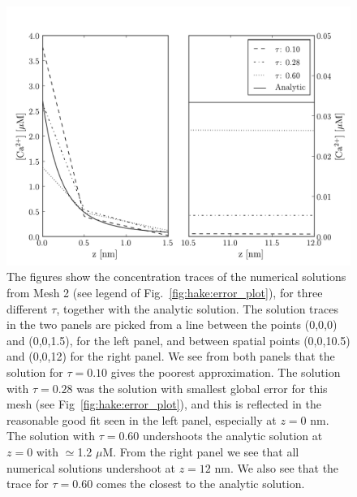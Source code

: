 \begin{figure}
    \label{fig:hake:traces_mesh_2}
  \centering
    \includegraphics[width=\largefig]{chapters/hake/pdf/traces_mesh_2}
    \caption[Concentration traces 2]{The figures show the
      concentration traces of the numerical solutions from Mesh 2 (see
      legend of Fig.~\ref{fig:hake:error_plot}), for three different
      $\tau$, together with the analytic solution. The solution traces
      in the two panels are picked from a line between the points
      (0,0,0) and (0,0,1.5), for the left panel, and between spatial
      points (0,0,10.5) and (0,0,12) for the right panel. We see from
      both panels that the solution for $\tau=0.10$ gives the poorest
      approximation. The solution with $\tau=0.28$ was the solution
      with smallest global error for this mesh (see
      Fig~\ref{fig:hake:error_plot}), and this is reflected in the
      reasonable good fit seen in the left panel, especially at $z=0$
      nm. The solution with $\tau=0.60$ undershoots the analytic
      solution at $z=0$ with $\simeq$1.2 $\mu$M. From the right panel
      we see that all numerical solutions undershoot at $z=12$ nm. We
      also see that the trace for $\tau=0.60$ comes the closest to the
      analytic solution.}
\end{figure}

